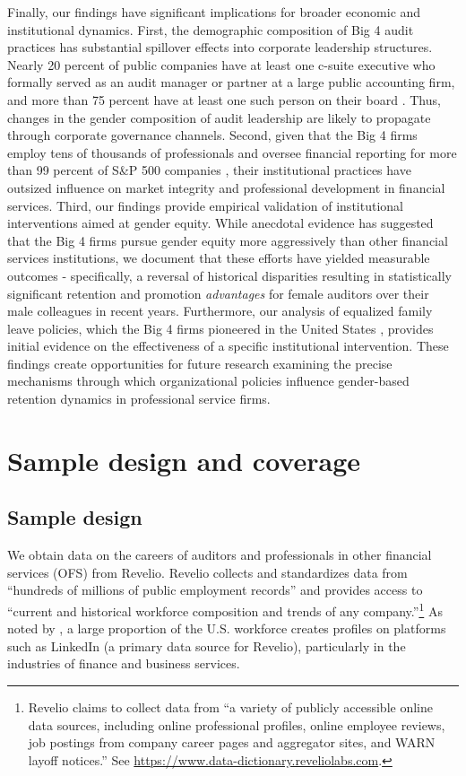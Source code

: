 \documentclass[11pt]{article}
\begin{document}
    Finally, our findings have significant implications for broader economic and institutional dynamics. First, the demographic composition of Big 4 audit practices has substantial spillover effects into corporate leadership structures. Nearly 20 percent of public companies have at least one c-suite executive who formally served as an audit manager or partner at a large public accounting firm, and more than 75 percent have at least one such person on their board \parencite{albrechtAuditorsRecognizePotential2018}. Thus, changes in the gender composition of audit leadership are likely to propagate through corporate governance channels. Second, given that the Big 4 firms employ tens of thousands of professionals and oversee financial reporting for more than 99 percent of S\&P 500 companies \parencite{pakalukAuditorMarketShare2017}, their institutional practices have outsized influence on market integrity and professional development in financial services. Third, our findings provide empirical validation of institutional interventions aimed at gender equity. While anecdotal evidence has suggested that the Big 4 firms pursue gender equity more aggressively than other financial services institutions, we document that these efforts have yielded measurable outcomes - specifically, a reversal of historical disparities resulting in statistically significant retention and promotion \textit{advantages} for female auditors over their male colleagues in recent years. Furthermore, our analysis of equalized family leave policies, which the Big 4 firms pioneered in the United States \parencite{ballesteroImportanceOrganizationalCulture2023}, provides initial evidence on the effectiveness of a specific institutional intervention. These findings create opportunities for future research examining the precise mechanisms through which organizational policies influence gender-based retention dynamics in professional service firms.

\section{Sample design and coverage} \label{section:Data}  
    
    \subsection{Sample design} \label{section:sampleDesign}
        We obtain data on the careers of auditors and professionals in other financial services (OFS) from Revelio. Revelio collects and standardizes data from ``hundreds of millions of public employment records'' and provides access to ``current and historical workforce composition and trends of any company.''\footnote{Revelio claims to collect data from ``a variety of publicly accessible online data sources, including online professional profiles, online employee reviews, job postings from company career pages and aggregator sites, and WARN layoff notices.'' See \url{https://www.data-dictionary.reveliolabs.com}.} As noted by \textcite{agrawalInformationDispersionEmployees2021}, a large proportion of the U.S. workforce creates profiles on platforms such as LinkedIn (a primary data source for Revelio), particularly in the industries of finance and business services. 
        
\end{document}
